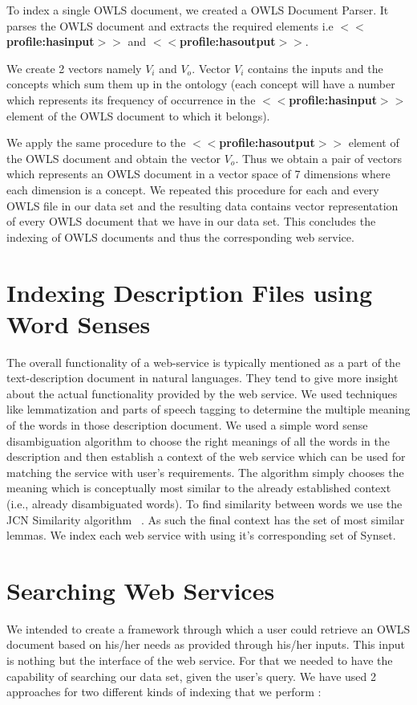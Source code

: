 \documentclass[12pt, oneside]{book}
\begin{document}
To index a single OWLS document, we created a OWLS Document Parser. It parses the OWLS document and extracts the required elements i.e \textbf{$<<$profile:hasinput$>>$} and \textbf{$<<$profile:hasoutput$>>$}. \\ \par
We create 2 vectors namely $V_{i}$ and $V_{o}$. Vector $V_{i}$ contains the inputs and the concepts which sum them up in the ontology (each concept will have a number which represents its frequency of occurrence in the \textbf{$<<$profile:hasinput$>>$} element of the OWLS document to which it belongs). \\ \par
We apply the same procedure to the \textbf{$<<$profile:hasoutput$>>$} element of the OWLS document and obtain the vector $V_{o}$. Thus we obtain a pair of vectors which represents an OWLS document in a vector space of 7 dimensions where each dimension is a concept. We repeated this procedure for each and every OWLS file in our data set and the resulting data contains vector representation of every OWLS document that we have in our data set. This concludes the indexing of OWLS documents and thus the corresponding web service.

\section{Indexing Description Files using Word Senses}
The overall functionality of a web-service is typically mentioned as a part of the text-description document in natural languages. They tend to give more insight about the actual functionality provided by the web service. We used techniques like lemmatization and parts of speech tagging to determine the multiple meaning of the words in those description document. We used a simple word sense disambiguation algorithm to choose the right meanings of all the words in the description and then establish a context of the web service which can be used for matching the service with user's requirements. The algorithm simply chooses the meaning which is conceptually most similar to the already established context (i.e., already disambiguated words). To find similarity between words we use the JCN Similarity algorithm ~\cite{jcn}. As such the final context has the set of most similar lemmas. We index each web service with using it's corresponding set of Synset.

\section{Searching Web Services}
We intended to create a framework through which a user could retrieve an OWLS document based on his/her needs as provided through his/her inputs. This input is nothing but the interface of the web service. For that we needed to have the capability of searching our data set, given the user's query. We have used 2 approaches for two different kinds of indexing that we perform :
\end{document}
